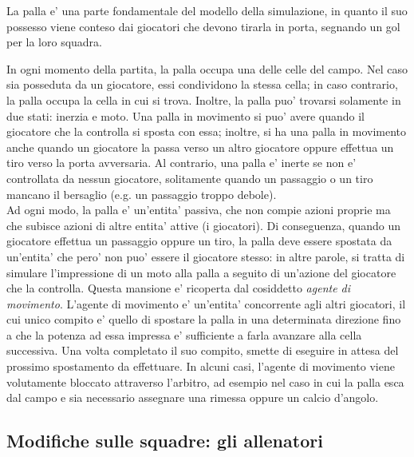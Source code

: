 La palla e' una parte fondamentale del modello della simulazione, in quanto il suo possesso viene conteso dai giocatori che devono tirarla in porta, segnando un gol per la loro squadra.


In ogni momento della partita, la palla occupa una delle celle del campo. Nel caso sia posseduta da un giocatore, essi condividono la stessa cella; in caso contrario, la palla occupa la cella in cui si trova. Inoltre, la palla puo' trovarsi solamente in due stati: inerzia e moto. Una palla in movimento si puo' avere quando il giocatore che la controlla si sposta con essa; inoltre, si ha una palla in movimento anche quando un giocatore la passa verso un altro giocatore oppure effettua un tiro verso la porta avversaria. Al contrario, una palla e' inerte se non e' controllata da nessun giocatore, solitamente quando un passaggio o un tiro mancano il bersaglio (e.g. un passaggio troppo debole).\\

Ad ogni modo, la palla e' un'entita' passiva, che non compie azioni proprie ma che subisce azioni di altre entita' attive (i giocatori). Di conseguenza, quando un giocatore effettua un passaggio oppure un tiro, la palla deve essere spostata da un'entita' che pero' non puo' essere il giocatore stesso: in altre parole, si tratta di simulare l'impressione di un moto alla palla a seguito di un'azione del giocatore che la controlla. Questa mansione e' ricoperta dal cosiddetto \textit{agente di movimento}. L'agente di movimento e' un'entita' concorrente agli altri giocatori, il cui unico compito e' quello di spostare la palla in una determinata direzione fino a che la potenza ad essa impressa e' sufficiente a farla avanzare alla cella successiva. Una volta completato il suo compito, smette di eseguire in attesa del prossimo spostamento da effettuare. In alcuni casi, l'agente di movimento viene volutamente bloccato attraverso l'arbitro, ad esempio nel caso in cui la palla esca dal campo e sia necessario assegnare una rimessa oppure un calcio d'angolo.

\subsection*{Modifiche sulle squadre: gli allenatori}
%
\label{sec:modello_squadre_allenatori}

